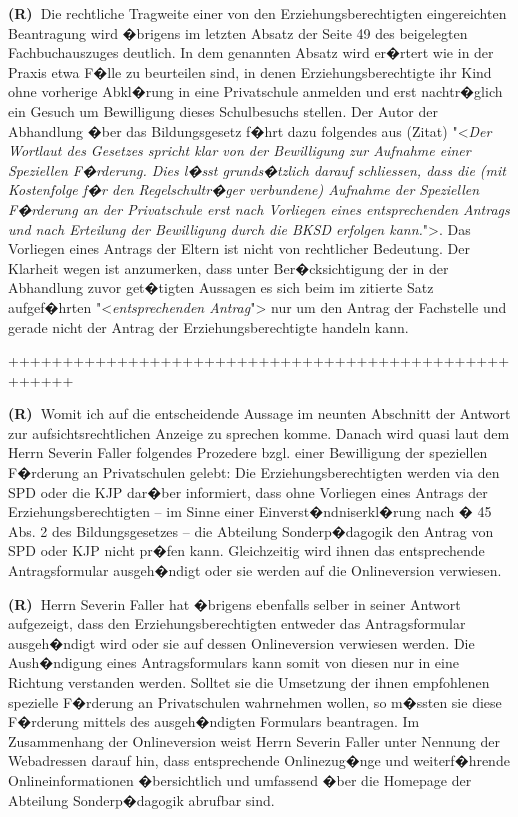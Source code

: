 \documentclass[paper=a4,fontsize=12pt, oneside, numbers=noenddot]{scrbook}
\newcounter{rz}
\newcommand{\Rz}{\addtocounter{rz}{1}\textbf{(R\arabic{rz})~}}
\begin{document}
	
	\Rz Die rechtliche Tragweite einer von den Erziehungsberechtigten eingereichten Beantragung wird �brigens im letzten Absatz der Seite 49 des beigelegten Fachbuchauszuges deutlich. In dem genannten Absatz wird er�rtert wie in der Praxis etwa F�lle zu beurteilen sind, in denen Erziehungsberechtigte ihr Kind ohne vorherige Abkl�rung in eine Privatschule anmelden und erst nachtr�glich ein Gesuch um Bewilligung dieses Schulbesuchs stellen. Der Autor der Abhandlung �ber das Bildungsgesetz f�hrt dazu folgendes aus (Zitat) "<\textit{Der Wortlaut des Gesetzes spricht klar von der Bewilligung zur Aufnahme einer Speziellen F�rderung. Dies l�sst grunds�tzlich darauf schliessen, dass die (mit Kostenfolge f�r den Regelschultr�ger verbundene) Aufnahme der Speziellen F�rderung an der Privatschule erst nach Vorliegen eines entsprechenden Antrags und nach Erteilung der Bewilligung durch die BKSD erfolgen kann.}">. Das Vorliegen eines Antrags der Eltern ist nicht von rechtlicher Bedeutung. Der Klarheit wegen ist anzumerken, dass unter Ber�cksichtigung der in der Abhandlung zuvor get�tigten Aussagen es sich beim im zitierte Satz aufgef�hrten "<\textit{entsprechenden Antrag}"> nur um den Antrag der Fachstelle und gerade nicht der Antrag der Erziehungsberechtigte handeln kann.
	
	++++++++++++++++++++++++++++++++++++++++++++++++++++
	
	\Rz Womit ich auf die entscheidende Aussage im neunten Abschnitt der Antwort zur aufsichtsrechtlichen Anzeige zu sprechen komme. Danach wird quasi laut dem Herrn Severin Faller folgendes Prozedere bzgl. einer Bewilligung der speziellen F�rderung an Privatschulen gelebt: Die Erziehungsberechtigten werden via den SPD oder die KJP dar�ber informiert, dass ohne Vorliegen eines Antrags der Erziehungsberechtigten -- im Sinne einer Einverst�ndniserkl�rung nach � 45 Abs. 2 des Bildungsgesetzes -- die Abteilung Sonderp�dagogik den Antrag von SPD oder KJP nicht pr�fen kann. Gleichzeitig wird ihnen das entsprechende Antragsformular ausgeh�ndigt oder sie werden auf die Onlineversion verwiesen. 
	
	
	\Rz Herrn Severin Faller hat �brigens ebenfalls selber in seiner Antwort aufgezeigt, dass den Erziehungsberechtigten entweder das Antragsformular ausgeh�ndigt wird oder sie auf dessen Onlineversion verwiesen werden. Die Aush�ndigung eines Antragsformulars kann somit von diesen nur in eine Richtung verstanden werden. Solltet sie die Umsetzung der ihnen empfohlenen spezielle F�rderung an Privatschulen wahrnehmen wollen, so m�ssten sie diese F�rderung mittels des ausgeh�ndigten Formulars beantragen. Im Zusammenhang der Onlineversion weist Herrn Severin Faller unter Nennung der Webadressen darauf hin, dass entsprechende Onlinezug�nge und weiterf�hrende Onlineinformationen �bersichtlich und umfassend �ber die Homepage der Abteilung Sonderp�dagogik abrufbar sind.
	
\end{document}

